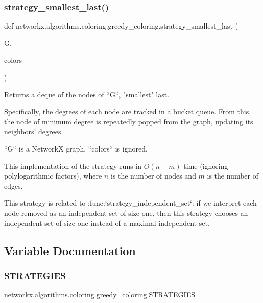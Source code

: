 \subsubsection{\texorpdfstring{strategy\+\_\+smallest\+\_\+last()}{strategy\_smallest\_last()}}
{\footnotesize\ttfamily def networkx.\+algorithms.\+coloring.\+greedy\+\_\+coloring.\+strategy\+\_\+smallest\+\_\+last (\begin{DoxyParamCaption}\item[{}]{G,  }\item[{}]{colors }\end{DoxyParamCaption})}

\begin{DoxyVerb}Returns a deque of the nodes of ``G``, "smallest" last.

Specifically, the degrees of each node are tracked in a bucket queue.
From this, the node of minimum degree is repeatedly popped from the
graph, updating its neighbors' degrees.

``G`` is a NetworkX graph. ``colors`` is ignored.

This implementation of the strategy runs in $O(n + m)$ time
(ignoring polylogarithmic factors), where $n$ is the number of nodes
and $m$ is the number of edges.

This strategy is related to :func:`strategy_independent_set`: if we
interpret each node removed as an independent set of size one, then
this strategy chooses an independent set of size one instead of a
maximal independent set.\end{DoxyVerb}
 

\subsection{Variable Documentation}
\mbox{\label{namespacenetworkx_1_1algorithms_1_1coloring_1_1greedy__coloring_a23e5a17ce4b85e1b4d439f4f9df0dcb7}} 
\subsubsection{\texorpdfstring{S\+T\+R\+A\+T\+E\+G\+I\+ES}{STRATEGIES}}
{\footnotesize\ttfamily networkx.\+algorithms.\+coloring.\+greedy\+\_\+coloring.\+S\+T\+R\+A\+T\+E\+G\+I\+ES}

